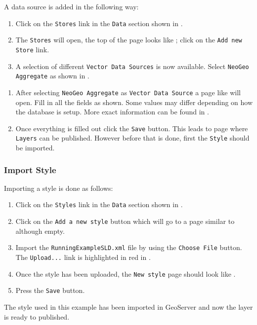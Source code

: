 A data source is added in the following way:
\begin{enumerate}
	\item Click on the \lstinline|Stores| link in the \lstinline|Data|
		section shown in .
	\item The \lstinline|Stores| will open, the top of the page looks like
		; click on the \lstinline|Add new Store| link.
	\item A selection of different \lstinline|Vector Data Sources| is now
		available. Select \lstinline|NeoGeo Aggregate| as shown in
		. 
\end{enumerate}

\begin{enumerate}[resume]
	\item After selecting \lstinline|NeoGeo Aggregate| as
		\lstinline|Vector Data Source| a page like 
		will open. Fill in all the fields as shown. Some values may differ
		depending on how the database is setup. More exact information can
		be found in .
	\item Once everything is filled out click the \lstinline|Save| button.
		This leads to page where \lstinline|Layers| can be published.
		However before that is done, first the \lstinline|Style| should
		be imported.
\end{enumerate}

\subsubsection{Import Style}

Importing a style is done as follows:
\begin{enumerate}[resume]
	\item Click on the \lstinline|Styles| link in the \lstinline|Data|
		section shown in .
	\item Click on the \lstinline|Add a new style| button which will go to a
		page similar to  although empty.
	\item Import the \lstinline|RunningExampleSLD.xml| file by using the
		\lstinline|Choose File| button. The \lstinline|Upload...| link
		is highlighted in red in .
	\item Once the style has been uploaded, the \lstinline|New style| page
		should look like .
	\item Press the \lstinline|Save| button.
\end{enumerate}
The style used in this example has been imported in GeoServer and now the
layer is ready to published.

